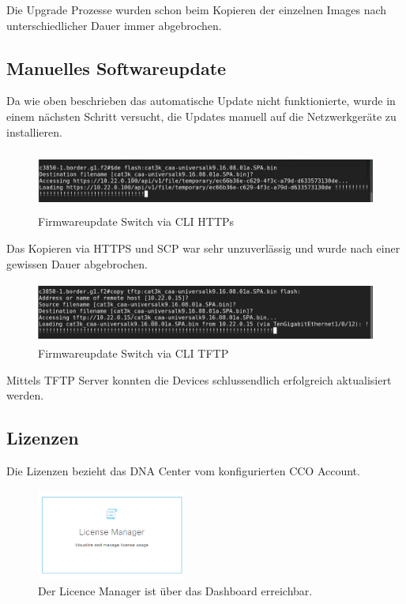 Die Upgrade Prozesse wurden schon beim Kopieren der einzelnen Images nach unterschiedlicher Dauer immer abgebrochen.

\subsection{Manuelles Softwareupdate}
Da wie oben beschrieben das automatische Update nicht funktionierte, wurde in einem nächsten Schritt versucht, die Updates manuell auf die Netzwerkgeräte zu installieren. 

\begin{figure}[H]
	\centering
	\includegraphics[height=2cm]{img/updates/Selection_082.png}
	\caption{Firmwareupdate Switch via CLI HTTPs}
	\label{fig:dna-center-provision-updates-2}
\end{figure}
Das Kopieren via HTTPS und SCP war sehr unzuverlässig und wurde nach einer gewissen Dauer abgebrochen.

\begin{figure}[H]
	\centering
	\includegraphics[height=2cm]{img/updates/Selection_111.png}
	\caption{Firmwareupdate Switch via CLI TFTP}
	\label{fig:dna-center-provision-updates-4}
\end{figure}
Mittels TFTP Server konnten die Devices schlussendlich erfolgreich aktualisiert werden.

\subsection{Lizenzen}
Die Lizenzen bezieht das DNA Center vom konfigurierten CCO Account. 
\begin{figure}[H]
	\centering
	\includegraphics[height=3cm]{img/LicenceManager_001.png}
	\caption{Der Licence Manager ist über das Dashboard erreichbar.}
	\label{fig:dna-center-licence-1}
\end{figure}

